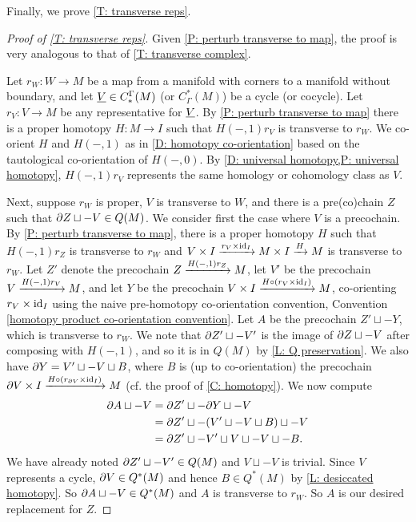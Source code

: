 Finally, we prove \cref{T: transverse reps}.

\begin{proof}[Proof of \cref{T: transverse reps}]
	Given \cref{P: perturb transverse to map}, the proof is very analogous to that of \cref{T: transverse complex}.

	Let $r_W \colon W \to M$ be a map from a manifold with corners to a manifold without boundary, and let $\underline{V} \in C_*^\Gamma(M)$ (or $C^*_\Gamma(M)$) be a cycle (or cocycle).
	Let $r_V \colon V \to M$ be any representative for $\underline{V}$.
	By \cref{P: perturb transverse to map} there is a proper homotopy $H \colon M \to I$ such that $H(-,1)r_V$ is transverse to $r_W$.
	We co-orient $H$ and $H(-,1)$ as in \cref{D: homotopy co-orientation} based on the tautological co-orientation of $H(-,0)$.
	By \cref{D: universal homotopy,P: universal homotopy}, $H(-,1)r_V$ represents the same homology or cohomology class as $V$.

	Next, suppose $r_W$ is proper, $V$ is transverse to $W$, and there is a pre(co)chain $Z$ such that $\partial Z \sqcup -V \in Q(M)$.
	We consider first the case where $V$ is a precochain.
	By \cref{P: perturb transverse to map}, there is a proper homotopy $H$ such that $H(-,1)r_Z$ is transverse to $r_W$ and $V \times I \xrightarrow{r_V \times \mathrm{id}_I} M \times I \xrightarrow{H} M$ is transverse to $r_W$.
	Let \(Z'\) denote the precochain \(Z \xrightarrow{H(-,1)r_Z} M\), let \(V'\) be the precochain \(V \xrightarrow{H(-,1)r_V} M\), and let \(Y\) be the precochain \(V \times I \xrightarrow{H\circ (r_V \times \mathrm{id}_I)} M\), co-orienting \(r_V \times \mathrm{id}_I\) using the naive pre-homotopy co-orientation convention, Convention \ref{homotopy product co-orientation convention}.
	Let $A$ be the precochain $Z' \sqcup -Y$, which is transverse to $r_W$.
	We note that $\partial Z' \sqcup -V'$ is the image of $\partial Z \sqcup -V$ after composing with $H(-,1)$, and so it is in $Q(M)$ by \cref{L: Q preservation}.
	We also have $\partial Y = V' \sqcup -V \sqcup B$, where $B$ is (up to co-orientation) the precochain $\partial V \times I \xrightarrow{H\circ (r_{\partial V} \times \mathrm{id}_I)} M$ (cf. the proof of \cref{C: homotopy}).
	We now compute
	\begin{align*}
		\partial A \sqcup -V &= \partial Z' \sqcup -\partial Y \sqcup -V\\
		&= \partial Z' \sqcup -(V' \sqcup -V \sqcup B) \sqcup -V\\
		&= \partial Z' \sqcup -V' \sqcup V \sqcup -V \sqcup -B.
	\end{align*}
	We have already noted $\partial Z' \sqcup -V' \in Q(M)$ and $V \sqcup -V$ is trivial.
	Since $V$ represents a cycle, $\partial V \in Q^*(M)$ and hence $B \in Q^*(M)$ by \cref{L: desiccated homotopy}.
	So $\partial A \sqcup -V \in Q^*(M)$ and $A$ is transverse to $r_W$.
	So $A$ is our desired replacement for $Z$.


\end{proof}
